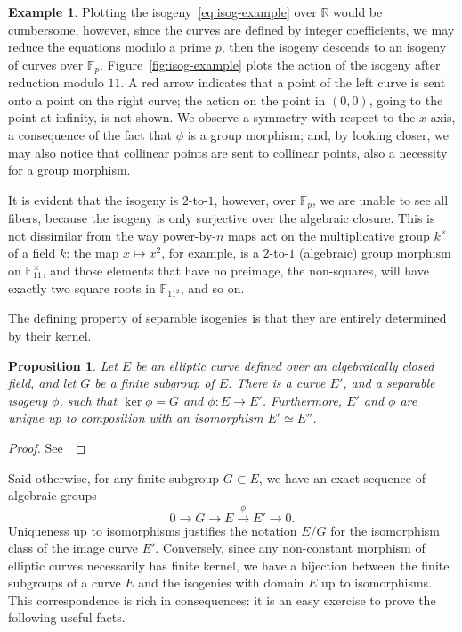 \documentclass[10pt]{article}
\theoremstyle{plain}
\newtheorem{proposition}[theorem]{Proposition}
\theoremstyle{definition}
\newtheorem{example}[theorem]{Example}
\def\F{\ensuremath{\mathbb{F}}}
\begin{document}
\begin{example}
  Plotting the isogeny~\eqref{eq:isog-example} over $ℝ$ would be
  cumbersome, however, since the curves are defined by integer
  coefficients, we may reduce the equations modulo a prime $p$, then
  the isogeny descends to an isogeny of curves over $\F_p$. %
  Figure~\ref{fig:isog-example} plots the action of the isogeny after
  reduction modulo $11$. %
  A red arrow indicates that a point of the left curve is sent onto a
  point on the right curve; the action on the point in $(0,0)$, going to
  the point at infinity, is not shown. %
  We observe a symmetry with respect to the $x$-axis, a consequence of
  the fact that $ϕ$ is a group morphism; and, by looking closer, we may
  also notice that collinear points are sent to collinear points, also a
  necessity for a group morphism. %

  It is evident that the isogeny is $2$-to-$1$, however, over $\F_p$,
  we are unable to see all fibers, because the isogeny is only
  surjective over the algebraic closure. %
  This is not dissimilar from the way power-by-$n$ maps act on the
  multiplicative group $k^×$ of a field $k$: the map $x↦x^2$, for
  example, is a $2$-to-$1$ (algebraic) group morphism on
  $\F_{11}^\times$, and those elements that have no preimage, the
  non-squares, will have exactly two square roots in $\F_{11^2}$, and
  so on. %
\end{example}

The defining property of separable isogenies is that they are entirely
determined by their kernel. %

\begin{proposition}
  \label{prop:isoker}
  Let $E$ be an elliptic curve defined over an algebraically closed
  field, and let $G$ be a finite subgroup of $E$. %
  There is a curve $E'$, and a separable isogeny $ϕ$, such that
  $\ker ϕ=G$ and $ϕ:E→ E'$. %
  Furthermore, $E'$ and $ϕ$ are unique up to composition with an
  isomorphism $E'≃E''$. %
\end{proposition}
\begin{proof}
  See~\cite[Prop.~III.4.12]{silverman:elliptic}
\end{proof}

Said otherwise, for any finite subgroup $G⊂E$, we have an exact
sequence of algebraic groups
\begin{equation*}
  0 → G → E \overset{ϕ}{→} E' → 0.
\end{equation*}
Uniqueness up to isomorphisms justifies the notation $E/G$ for the
isomorphism class of the image curve $E'$. %
Conversely, since any non-constant morphism of elliptic curves
necessarily has finite kernel, we have a bijection between the finite
subgroups of a curve $E$ and the isogenies with domain $E$ up to
isomorphisms. %
This correspondence is rich in consequences: it is an easy exercise to
prove the following useful facts. %
\end{document}
